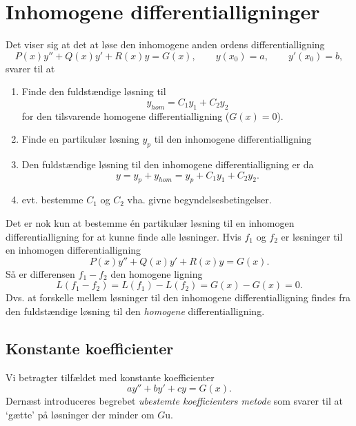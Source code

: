 \section{Inhomogene differentialligninger}
Det viser sig at det at løse den inhomogene anden ordens differentialligning
\[
P(x)y'' + Q(x)y' + R(x)y = G(x), \qquad y(x_0) = a, \qquad y'(x_0)=b  
,\]
svarer til at
\begin{enumerate}
  \item Finde den fuldstændige løsning til
    \[
    y_{hom} = C_1y_1 + C_2y_2
    \]
    for den tilsvarende homogene differentialligning ($G(x) = 0$).
  \item Finde en partikulær løsning $y_p$ til den inhomogene differentialligning
  \item Den fuldstændige løsning til den inhomogene differentialligning er da
    \[
    y = y_p + y_{hom}  = y_p + C_1y_1 + C_2y_2
    .\]
  \item evt. bestemme $C_1$ og $C_2$ vha. givne begyndelsesbetingelser.
\end{enumerate}
\begin{sæt}
  Det er nok kun at bestemme én partikulær løsning til en inhomogen differentialligning for at kunne finde alle løsninger.
  \tcblower
  Hvis $f_1$ og $f_2$ er løsninger til en inhomogen differentialligning
  \[
  P(x)y'' + Q(x)y' + R(x)y = G(x)
  .\]
  Så er differensen $f_1-f_2$ den homogene ligning
  \[
  L(f_1-f_2) = L(f_1) - L(f_2) = G(x) - G(x) = 0
  .\]
  Dvs. at forskelle mellem løsninger til den inhomogene differentialligning findes fra den fuldstændige løsning til den \textit{homogene} differentialligning.
\end{sæt}

\subsection{Konstante koefficienter}
Vi betragter tilfældet med konstante koefficienter
\[
ay'' + by' + cy = G(x)
.\]
Dernæst introduceres begrebet \emph{ubestemte koefficienters metode} som svarer til at `gætte' på løsninger der minder om $G$u.

